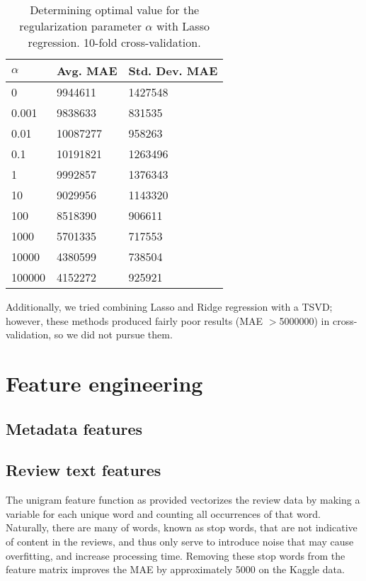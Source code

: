 \documentclass[11pt]{amsart}
\begin{document}
\begin{table}[h]
\begin{tabular}{@{}lll@{}}
\toprule
$\alpha$ & Avg. MAE & Std. Dev. MAE \\ \midrule
0      & 9944611  & 1427548 \\
0.001  & 9838633  & 831535  \\
0.01   & 10087277 & 958263  \\
0.1    & 10191821 & 1263496 \\
1      & 9992857  & 1376343 \\
10     & 9029956  & 1143320 \\
100    & 8518390  & 906611  \\
1000   & 5701335  & 717553  \\
10000  & 4380599  & 738504  \\
100000 & 4152272  & 925921 \\ \bottomrule
\end{tabular}
\caption{Determining optimal value for the regularization parameter $\alpha$ with Lasso regression. 10-fold cross-validation.}
\end{table}

Additionally, we tried combining Lasso and Ridge regression with a TSVD; however, these methods produced fairly poor results (MAE $>$5000000) in cross-validation, so we did not pursue them.

\section{Feature engineering}

\subsection{Metadata features}

\subsection{Review text features}
The unigram feature function as provided vectorizes the review data by making a variable for each unique word and counting all occurrences of that word. Naturally, there are many of words, known as stop words, that are not indicative of content in the reviews, and thus only serve to introduce noise that may cause overfitting, and increase processing time. Removing these stop words from the feature matrix improves the MAE by approximately 5000 on the Kaggle data.
\end{document}
